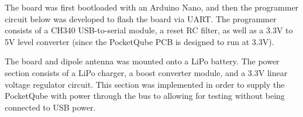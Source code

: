 The board was first bootloaded with an Arduino Nano, and then the programmer circuit below was developed to flash the board via UART. The programmer consists of a CH340 USB-to-serial module, a reset RC filter, as well as a 3.3V to 5V level converter (since the PocketQube PCB is designed to run at 3.3V).

The board and dipole antenna was mounted onto a LiPo battery. The power section consists of a LiPo charger, a boost converter module, and a 3.3V linear voltage regulator circuit. This section was implemented in order to supply the PocketQube with power through the bus to allowing for testing without being connected to USB power.
